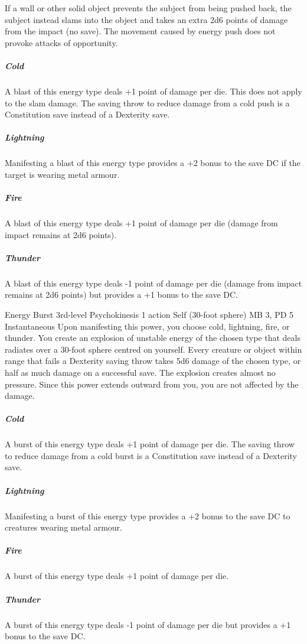   If a wall or other solid object prevents the subject from being pushed back,
  the subject instead slams into the object and takes an extra
  2d6 points of damage from the impact (no save).
  The movement caused by energy push does not provoke attacks of opportunity.
  \subparagraph{Cold}
    A blast of this energy type deals +1 point of damage per die.
    This does not apply to the slam damage.
    The saving throw to reduce damage from a cold push
    is a Constitution save instead of a Dexterity save.
  \subparagraph{Lightning}
    Manifesting a blast of this energy type provides a +2 bonus
    to the save DC if the target is wearing metal armour.
  \subparagraph{Fire}
    A blast of this energy type deals +1 point of damage per die
    (damage from impact remains at 2d6 points).
  \subparagraph{Thunder}
    A blast of this energy type deals -1 point of damage per die
    (damage from impact remains at 2d6 points)
    but provides a +1 bonus to the save DC.

\DndPowerHeader%
  {Energy Burst}
  {3rd-level Psychokinesis}
  {1 action}
  {Self (30-foot sphere)}
  {MB 3, PD 5}
  {Instantaneous}
Upon manifesting this power, you choose cold, lightning,
fire, or thunder.
You create an explosion of unstable energy of the chosen type
that deals radiates over a 30-foot sphere
centred on yourself.
Every creature or object within range that fails a Dexterity saving throw
takes 5d6 damage of the chosen type, or
half as much damage on a successful save.
The explosion creates almost no pressure.
Since this power extends outward from you,
you are not affected by the damage.

  \subparagraph{Cold}
  A burst of this energy type deals +1 point of damage per die.
  The saving throw to reduce damage from a cold burst
  is a Constitution save instead of a Dexterity save.
  
  \subparagraph{Lightning}
  Manifesting a burst of this energy type provides a +2 bonus
  to the save DC to creatures wearing metal armour.
  
  \subparagraph{Fire}
  A burst of this energy type deals +1 point of damage per die.
  
  \subparagraph{Thunder}
    A burst of this energy type deals -1 point of damage per die
    but provides a +1 bonus to the save DC.

